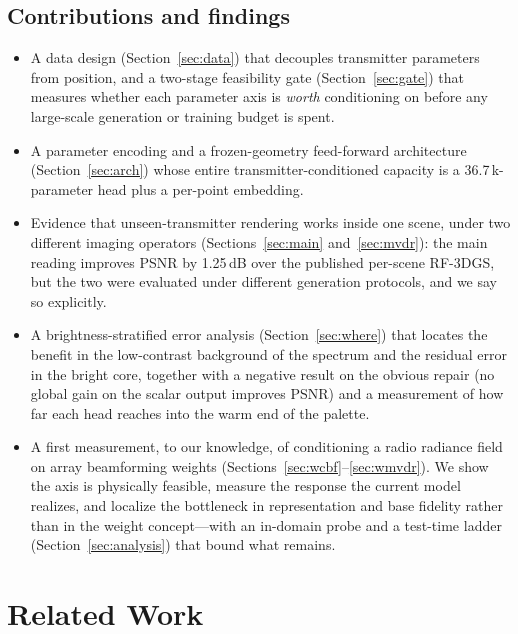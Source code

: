 \documentclass[conference]{IEEEtran}
\begin{document}
\subsection{Contributions and findings}
\begin{itemize}
\item A data design (Section~\ref{sec:data}) that decouples transmitter
parameters from position, and a two-stage feasibility gate
(Section~\ref{sec:gate}) that measures whether each parameter axis is
\emph{worth} conditioning on before any large-scale generation or training
budget is spent.
\item A parameter encoding and a frozen-geometry feed-forward architecture
(Section~\ref{sec:arch}) whose entire transmitter-conditioned capacity is a
36.7\,k-parameter head plus a per-point embedding.
\item Evidence that unseen-transmitter rendering works inside one scene, under
two different imaging operators (Sections~\ref{sec:main} and~\ref{sec:mvdr}): the
main reading improves PSNR by 1.25\,dB over the published per-scene RF-3DGS, but
the two were evaluated under different generation protocols, and we say so
explicitly.
\item A brightness-stratified error analysis (Section~\ref{sec:where}) that
locates the benefit in the low-contrast background of the spectrum and the
residual error in the bright core, together with a negative result on the
obvious repair (no global gain on the scalar output improves PSNR) and a
measurement of how far each head reaches into the warm end of the palette.
\item A first measurement, to our knowledge, of conditioning a radio radiance
field on array beamforming weights
(Sections~\ref{sec:wcbf}--\ref{sec:wmvdr}). We show the axis is physically
feasible, measure the response the current model realizes, and localize the
bottleneck in representation and base fidelity rather than in the weight
concept---with an in-domain probe and a test-time ladder
(Section~\ref{sec:analysis}) that bound what remains.
\end{itemize}

\section{Related Work}
\label{sec:rel}
\end{document}
